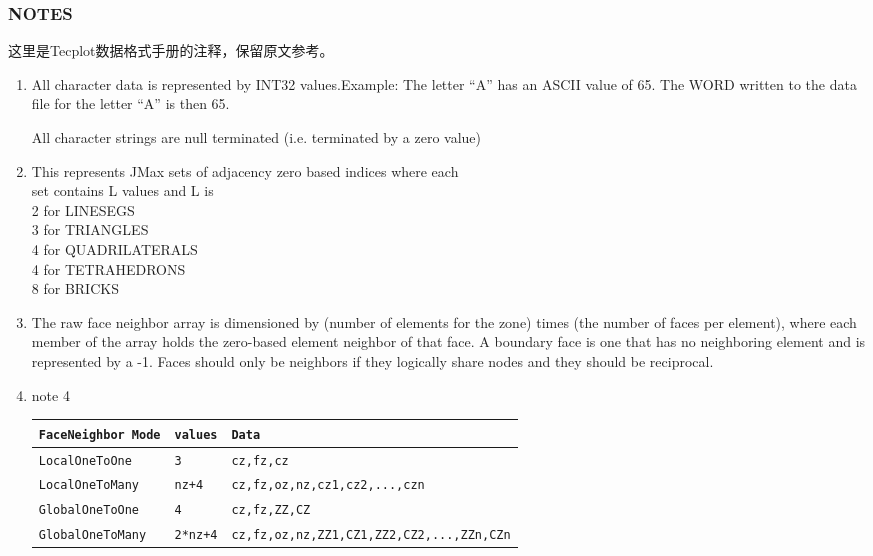 \documentclass[lang=cn,11pt,a4paper]{elegantpaper}
\begin{document}
\subsubsection{NOTES}\label{notes}
这里是Tecplot数据格式手册的注释，保留原文参考。
\begin{enumerate}
  \item 
  All character data is represented by INT32 values.Example: The letter “A” has an ASCII value of 65. 
  The WORD written to the data file for the letter “A” is then 65.
  
  All character strings are null terminated
 (i.e. terminated by a zero value)

 \item 
 This represents JMax sets of adjacency zero based indices where each\\
 set contains L values and L is\\
 2 for LINESEGS\\
 3 for TRIANGLES\\
 4 for QUADRILATERALS\\
 4 for TETRAHEDRONS\\
 8 for BRICKS

 \item 
 The raw face neighbor array is dimensioned by (number of elements for the zone) times 
 (the number of faces per element), where each member of the array holds the zero-based element neighbor of that face. 
 A boundary face is one that has no neighboring element and is represented by a -1. 
 Faces should only be neighbors if they logically share nodes and they should be reciprocal.
 \item note 4
 \begin{table}[!htb]
  \centering
  \begin{tabular}{*{3}{l}}
   \texttt{FaceNeighbor Mode} & \texttt{values} & \texttt{Data} \\
   \hline
   \texttt{LocalOneToOne} & \texttt{3} & \texttt{cz,fz,cz} \\
   \texttt{LocalOneToMany} & \texttt{nz+4} & \texttt{cz,fz,oz,nz,cz1,cz2,...,czn} \\
   \texttt{GlobalOneToOne} & \texttt{4} & \texttt{cz,fz,ZZ,CZ} \\
   \texttt{GlobalOneToMany} & \texttt{2*nz+4} & \texttt{cz,fz,oz,nz,ZZ1,CZ1,ZZ2,CZ2,...,ZZn,CZn} \\
   \hline
  \end{tabular}
\end{table}


\end{enumerate}
\end{document}
